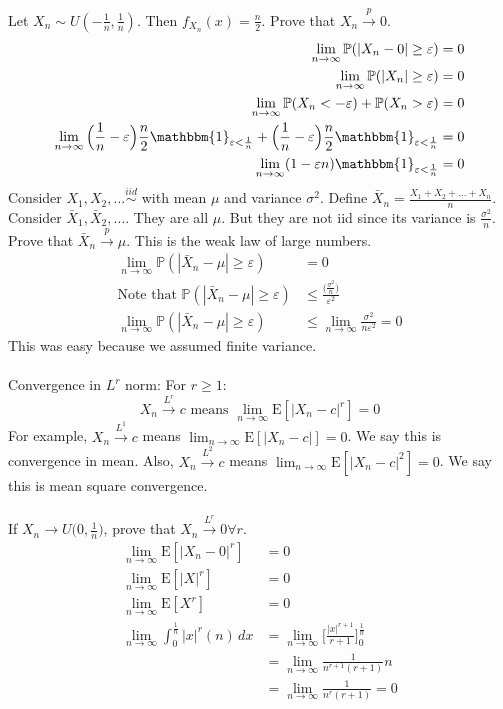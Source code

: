 \documentclass[12pt]{article}
\newcommand{\prob}[1]{\mathbb{P}(#1)}
\newcommand{\indicator}[1]{\mathbbm{1}_{#1}}
\newcommand{\iid}{\stackrel{iid}{\sim}}
\newcommand{\expected}[1]{\mathrm{E}[#1]}
\begin{document}
Let $X_n \sim U(-\frac{1}{n}, \frac{1}{n})$. Then $f_{X_n}(x) = \frac{n}{2}$. Prove that $X_n \stackrel{p}{\to} 0$. $$ \begin{aligned} \lim_{n \to \infty } \prob{|X_n - 0| \geq \varepsilon} &= 0 \\ \lim_{n \to \infty} \prob{|X_n| \geq \varepsilon} &= 0 \\ \lim_{n \to \infty} \prob{X_n < -\varepsilon} + \prob{X_n > \varepsilon} &= 0 \\ \lim_{n \to \infty} \Big( \frac{1}{n} - \varepsilon \Big)\frac{n}{2}\indicator{\varepsilon < \frac{1}{n}} + \Big( \frac{1}{n} - \varepsilon \Big)\frac{n}{2}\indicator{\varepsilon < \frac{1}{n}} &= 0 \\ \lim_{n \to \infty} (1 - \varepsilon n)\indicator{\varepsilon < \frac{1}{n}} &= 0 \end{aligned} $$ 
Consider $X_1, X_2, \dots \iid $ with mean $\mu$ and variance $\sigma^2$. Define $\bar{X}_n = \frac{X_1 + X_2 + \dots + X_n}{n}$. Consider $\bar{X}_1, \bar{X}_2, \dots$. They are all $\mu$. But they are not iid since its variance is $\frac{\sigma^2}{n}$. Prove that $\bar{X}_n \stackrel{p}{\to} \mu$. This is the weak law of large numbers. 
$$ \begin{aligned} \lim_{n \to \infty} \prob{|\bar{X}_n - \mu| \geq \varepsilon} &= 0 \\ \text{Note that } \prob{|\bar{X}_n - \mu| \geq \varepsilon} &\leq \frac{\Big( \frac{\sigma^2}{n}\Big)}{\varepsilon^2} \\ \lim_{n \to \infty} \prob{|\bar{X}_n - \mu| \geq \varepsilon} &\leq \lim_{n \to \infty} \frac{\sigma^2}{n\varepsilon^2} = 0 \end{aligned} $$ 
This was easy because we assumed finite variance. \\~\\
Convergence in $L^r$ norm: For $r \geq 1$: 
$$ X_n \stackrel{L^r}{\to} c \text{ means } \lim_{n \to \infty} \expected{|X_n - c|^r} = 0 $$ 
For example, $X_n \stackrel{L^1}{\to} c$ means $\lim_{n \to \infty} \expected{|X_n - c|} = 0$. We say this is convergence in mean. 
Also, $X_n \stackrel{L^2}{\to} c$ means $\lim_{n \to \infty} \expected{|X_n - c|^2} = 0$. We say this is mean square convergence. \\~\\
If $X_n \to U\Big( 0, \frac{1}{n}\Big)$, prove that $X_n \stackrel{L^r}{\to} 0 \forall r$. 
$$ \begin{aligned} \lim_{n \to \infty} \expected{|X_n - 0|^r} &= 0 \\ \lim_{n \to \infty} \expected{|X|^r} &= 0 \\ \lim_{n \to \infty} \expected{X^r} &= 0 \\ \lim_{n \to \infty} \int_0^{\frac{1}{n}} |x|^r (n) \, dx &= \lim_{n \to \infty} \Big[ \frac{|x|^{r + 1}}{r+1}\Big]_0^{\frac{1}{n}} \\ &= \lim_{n \to \infty} \frac{1}{n^{r+1} (r+1)} n \\ &= \lim_{n \to \infty} \frac{1}{n^r(r+1)} = 0 \end{aligned} $$ 
\end{document}
